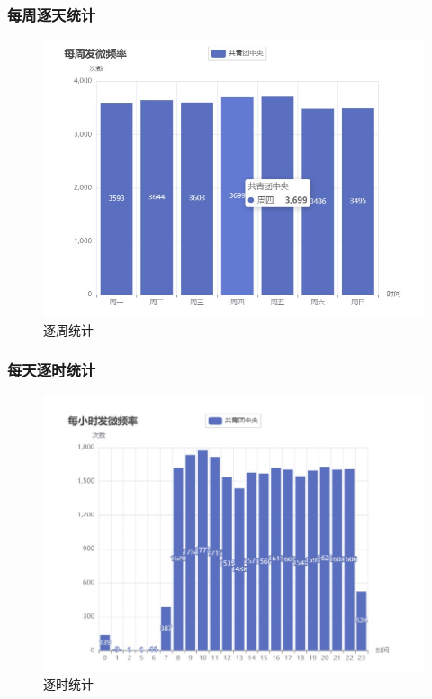 \subsubsection{每周逐天统计}
\begin{figure}[H]
    \centering
    \includegraphics[width=12cm]{figure/weekdayfre.jpg}
    \caption{逐周统计} \label{fig:weekdayfre}
\end{figure} 
\subsubsection{每天逐时统计}
\begin{figure}[H]
    \centering
    \includegraphics[width=12cm]{figure/hourfre.jpg}
    \caption{逐时统计} \label{fig:hourfre}
\end{figure} 
